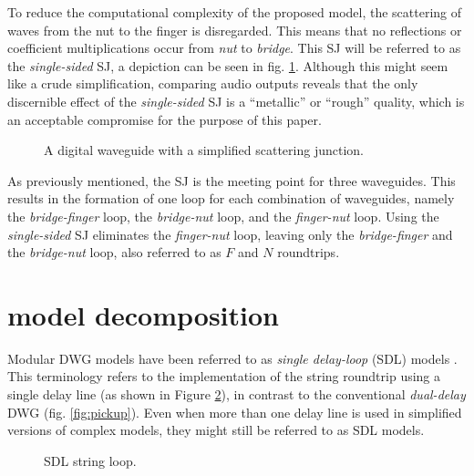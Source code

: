 \documentclass{sigchi}
\begin{document}
To reduce the computational complexity of the proposed model, the scattering of waves from the nut to the finger is disregarded.
This means that no reflections or coefficient multiplications occur from \textit{nut} to \textit{bridge}.
This SJ will be referred to as the \textit{single-sided} SJ, a depiction can be seen in fig. \ref{fig:waveguide_simple_sj}.
Although this might seem like a crude simplification, comparing audio outputs reveals that the only discernible effect of the \textit{single-sided} SJ is a ``metallic'' or ``rough'' quality, which is an acceptable compromise for the purpose of this paper.
\begin{figure}[h]
	\centering
	\scalebox{0.6}{}
	\caption{A digital waveguide with a simplified scattering junction.}
	\label{fig:waveguide_simple_sj}
\end{figure}

As previously mentioned, the SJ is the meeting point for three waveguides.
This results in the formation of one loop for each combination of waveguides, namely the \textit{bridge-finger} loop, the \textit{bridge-nut} loop, and the \textit{finger-nut} loop.
Using the \textit{single-sided} SJ eliminates the \textit{finger-nut} loop, leaving only the \textit{bridge-finger} and the \textit{bridge-nut} loop, also referred to as $F$ and $N$ roundtrips.

\section{model decomposition}

Modular DWG models have been referred to as \textit{single delay-loop} (SDL) models \cite{karjalainen_plucked-string_1998,pakarinen_physical_2005}.
This terminology refers to the implementation of the string roundtrip using a single delay line (as shown in Figure \ref{fig:sdl_string_loop}), in contrast to the conventional \textit{dual-delay} DWG (fig. \ref{fig:pickup}).
Even when more than one delay line is used in simplified versions of complex models, they might still be referred to as SDL models.
\begin{figure}[h]
	\centering
	\scalebox{0.75}{}
	\caption{SDL string loop.}
	\label{fig:sdl_string_loop}
\end{figure}

\end{document}
